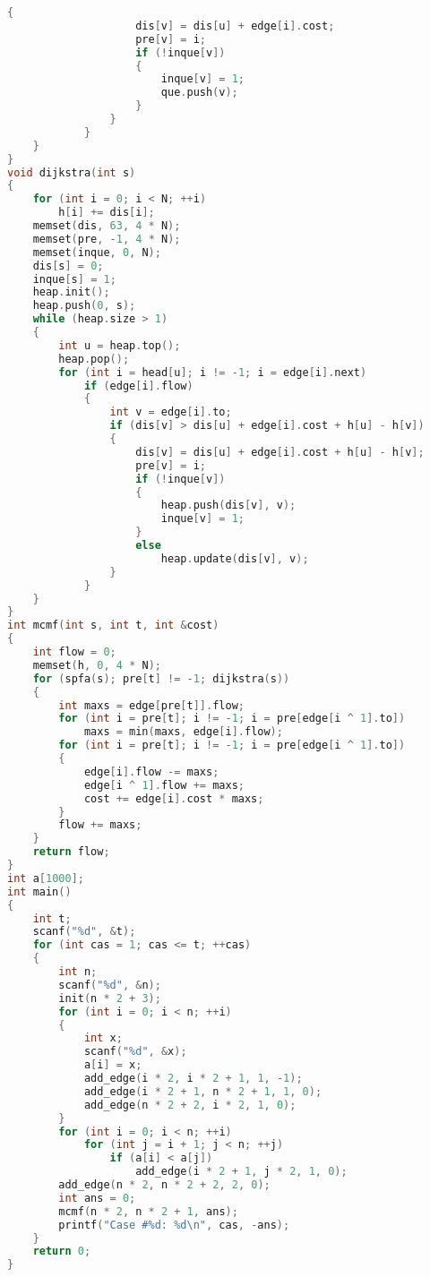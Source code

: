 \begin{lstlisting}[language=c++]
                {
                    dis[v] = dis[u] + edge[i].cost;
                    pre[v] = i;
                    if (!inque[v])
                    {
                        inque[v] = 1;
                        que.push(v);
                    }
                }
            }
    }
}
void dijkstra(int s)
{
    for (int i = 0; i < N; ++i)
        h[i] += dis[i];
    memset(dis, 63, 4 * N);
    memset(pre, -1, 4 * N);
    memset(inque, 0, N);
    dis[s] = 0;
    inque[s] = 1;
    heap.init();
    heap.push(0, s);
    while (heap.size > 1)
    {
        int u = heap.top();
        heap.pop();
        for (int i = head[u]; i != -1; i = edge[i].next)
            if (edge[i].flow)
            {
                int v = edge[i].to;
                if (dis[v] > dis[u] + edge[i].cost + h[u] - h[v])
                {
                    dis[v] = dis[u] + edge[i].cost + h[u] - h[v];
                    pre[v] = i;
                    if (!inque[v])
                    {
                        heap.push(dis[v], v);
                        inque[v] = 1;
                    }
                    else
                        heap.update(dis[v], v);
                }
            }
    }
}
int mcmf(int s, int t, int &cost)
{
    int flow = 0;
    memset(h, 0, 4 * N);
    for (spfa(s); pre[t] != -1; dijkstra(s))
	{
		int maxs = edge[pre[t]].flow;
		for (int i = pre[t]; i != -1; i = pre[edge[i ^ 1].to])
			maxs = min(maxs, edge[i].flow);	
        for (int i = pre[t]; i != -1; i = pre[edge[i ^ 1].to])
        {
            edge[i].flow -= maxs;
            edge[i ^ 1].flow += maxs;
            cost += edge[i].cost * maxs;
        }
		flow += maxs;
	}
    return flow;
}
int a[1000];
int main()
{
    int t;
    scanf("%d", &t);
    for (int cas = 1; cas <= t; ++cas)
    {
        int n;
        scanf("%d", &n);
        init(n * 2 + 3);
        for (int i = 0; i < n; ++i)
        {
            int x;
            scanf("%d", &x);
            a[i] = x;
            add_edge(i * 2, i * 2 + 1, 1, -1);
            add_edge(i * 2 + 1, n * 2 + 1, 1, 0);
            add_edge(n * 2 + 2, i * 2, 1, 0);
        }
        for (int i = 0; i < n; ++i)
            for (int j = i + 1; j < n; ++j)
                if (a[i] < a[j])
                    add_edge(i * 2 + 1, j * 2, 1, 0);
        add_edge(n * 2, n * 2 + 2, 2, 0);
        int ans = 0;
        mcmf(n * 2, n * 2 + 1, ans);
        printf("Case #%d: %d\n", cas, -ans);
    }
    return 0;
}
\end{lstlisting}
